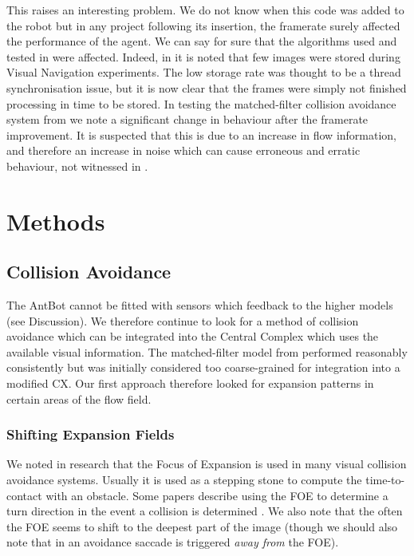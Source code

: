\documentclass[a4paper,11pt,twoside,openright]{article}
\let\oldsection\section
\def\section{\cleardoublepage\oldsection}
\begin{document}
This raises an interesting problem. We do not know when this code was added
to the robot but in any project following its insertion, the framerate surely
affected the performance of the agent. We can say for sure that the algorithms
used and tested in \cite{Mitchell2018} were affected. Indeed, in \cite{Mitchell2018}
it is noted that few images were stored during Visual Navigation experiments. The
low storage rate was thought to be a thread synchronisation issue, but it is now
clear that the frames were simply not finished processing in time to be stored.
In testing the matched-filter collision avoidance system from \cite{Mitchell2018}
we note a significant change in behaviour after the framerate improvement. It is
suspected that this is due to an increase in flow information, and therefore an
increase in noise which can cause erroneous and erratic behaviour, not witnessed
in \cite{Mitchell2018}.

\newpage

\section{ Methods } \label{sec:methods}
\subsection{ Collision Avoidance }
The AntBot cannot be fitted with sensors which feedback to the higher models
(see Discussion). We therefore continue to look for a method of collision
avoidance which can be integrated into the Central Complex which uses the
available visual information. The matched-filter model from \cite{Mitchell2018}
performed reasonably consistently but was initially considered too coarse-grained
for integration into a modified CX. Our first approach therefore looked for
expansion patterns in certain areas of the flow field.

\subsubsection{ Shifting Expansion Fields }
We noted in research that the Focus of Expansion is used in many visual collision
avoidance systems. Usually it is used as a stepping stone to compute the
time-to-contact with an obstacle. Some papers describe using the FOE to determine
a turn direction in the event a collision is determined \cite{Stewart2010,
  Vanderstap2012}. We also note that the often the FOE seems to shift to the
deepest part of the image \cite{Vanderstap2012, Souhila2007} (though we should
also note that in \cite{Stewart2010} an avoidance saccade is triggered
\textit{away from} the FOE).
\newline
\par
\end{document}
